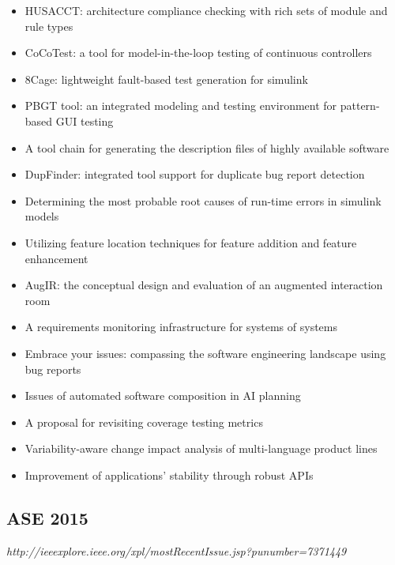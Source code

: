 {\begin{itemize}[itemsep=-1ex]
  \item HUSACCT: architecture compliance checking with rich sets of module and rule types
  \item CoCoTest: a tool for model-in-the-loop testing of continuous controllers
  \item 8Cage: lightweight fault-based test generation for simulink
  \item PBGT tool: an integrated modeling and testing environment for pattern-based GUI testing
  \item A tool chain for generating the description files of highly available software
  \item DupFinder: integrated tool support for duplicate bug report detection
  \item Determining the most probable root causes of run-time errors in simulink models
  \item Utilizing feature location techniques for feature addition and feature enhancement
  \item AugIR: the conceptual design and evaluation of an augmented interaction room
  \item A requirements monitoring infrastructure for systems of systems
  \item Embrace your issues: compassing the software engineering landscape using bug reports
  \item Issues of automated software composition in AI planning
  \item A proposal for revisiting coverage testing metrics
  \item Variability-aware change impact analysis of multi-language product lines
  \item Improvement of applications' stability through robust APIs
\end{itemize}
}

\subsection{ASE 2015}

{\small \em http://ieeexplore.ieee.org/xpl/mostRecentIssue.jsp?punumber=7371449}

